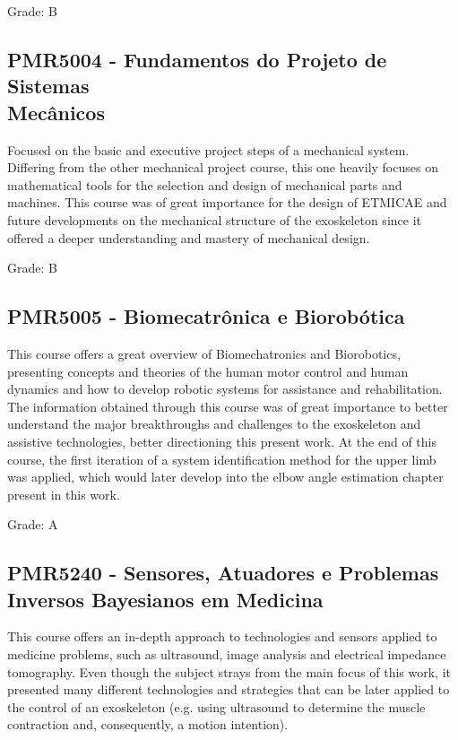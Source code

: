 Grade: B

\subsection{PMR5004 - Fundamentos do Projeto de Sistemas \\ Mecânicos}

Focused on the basic and executive project steps of a mechanical system. Differing from the other mechanical project course, this one heavily focuses on mathematical tools for the selection and design of mechanical parts and machines. This course was of great importance for the design of ETMICAE and future developments on the mechanical structure of the exoskeleton since it offered a deeper understanding and mastery of mechanical design.

Grade: B

\subsection{PMR5005 - Biomecatrônica e Biorobótica}

This course offers a great overview of Biomechatronics and Biorobotics, presenting concepts and theories of the human motor control and human dynamics and how to develop robotic systems for assistance and rehabilitation. The information obtained through this course was of great importance to better understand the major breakthroughs and challenges to the exoskeleton and assistive technologies, better directioning this present work. At the end of this course, the first iteration of a system identification method for the upper limb was applied, which would later develop into the elbow angle estimation chapter present in this work.

Grade: A

\subsection{PMR5240 - Sensores, Atuadores e Problemas Inversos Bayesianos em Medicina}

This course offers an in-depth approach to technologies and sensors applied to medicine problems, such as ultrasound, image analysis and electrical impedance tomography. Even though the subject strays from the main focus of this work, it presented many different technologies and strategies that can be later applied to the control of an exoskeleton (e.g. using ultrasound to determine the muscle contraction and, consequently, a motion intention).

